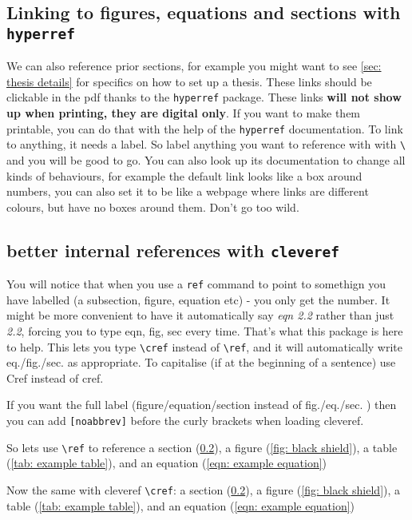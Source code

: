 \documentclass[../HWThesis.tex]{subfiles} %
\begin{document}
\begin{refsection}
\subsection{Linking to figures, equations and sections with \texttt{hyperref}}

We can also reference prior sections, for example you might want to see \cref{sec: thesis details} for specifics on how to set up a thesis. These links should be clickable in the pdf thanks to the \texttt{hyperref} package. These links \textbf{will not show up when printing, they are digital only}. If you want to make them printable, you can do that with the help of the \texttt{hyperref} documentation. To link to anything, it needs a label. So label anything you want to reference with with \texttt{\textbackslash \label{...}} and you will be good to go.  You can also look up its documentation to change all kinds of behaviours, for example the default link looks like a box around numbers, you can also set it to be like a webpage where links are different colours, but have no boxes around them. Don't go too wild. 

\subsection{better internal references with \texttt{cleveref}}
\label{sec: cleveref}

You will notice that when you use a \texttt{ref} command to point to somethign you have labelled (a subsection, figure, equation etc) - you only get the number. It might be more convenient to have it automatically say \textit{eqn 2.2} rather than just \textit{2.2}, forcing you to type eqn, fig, sec every time. That's what this package is here to help. This lets you type \texttt{\textbackslash cref} instead of \texttt{\textbackslash ref}, and it will automatically write eq./fig./sec. as appropriate. To capitalise (if at the beginning of a sentence) use Cref instead of cref. 

If you want the full label (figure/equation/section instead of fig./eq./sec. ) then you can add \texttt{[noabbrev]} before the curly brackets when loading cleveref. 

So lets use \texttt{\textbackslash ref} to reference a section (\ref{sec: cleveref}), a figure (\ref{fig: black shield}), a table (\ref{tab: example table}), and an equation (\ref{eqn: example equation})

Now the same with cleveref \texttt{\textbackslash cref}: a section (\cref{sec: cleveref}), a figure (\cref{fig: black shield}), a table (\cref{tab: example table}), and an equation (\cref{eqn: example equation})


\end{refsection}
\end{document}
